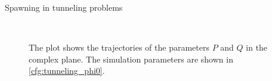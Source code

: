 \begin{chapter}{Spawning in tunneling problems}
\begin{figure}[h!]
  \centering
   \\
  \caption[Complex trajectories for $P$ and $Q$]{
  The plot shows the trajectories of the parameters $P$ and $Q$ in the complex plane.
  The simulation parameters are shown in \ref{cfg:tunneling_phi0}.
  \label{fig:traject_phi0}
  }
\end{figure}


\end{chapter}
